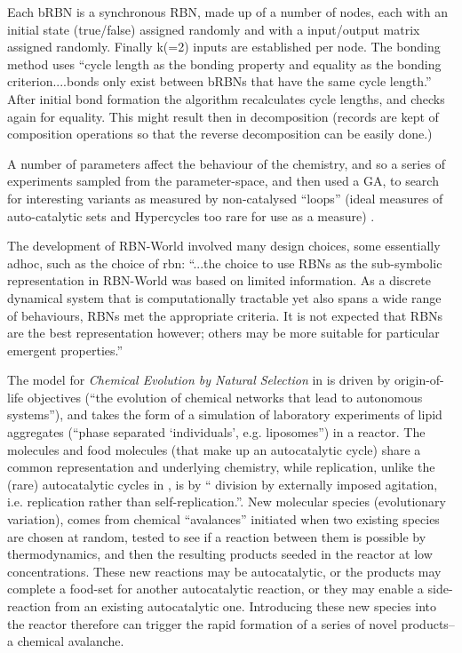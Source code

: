 Each bRBN is a synchronous RBN, made up of a number of nodes, each with an initial state (true/false) assigned randomly and with a input/output matrix assigned randomly. Finally k(=2) inputs are established per node. The bonding method uses ``cycle length as the bonding property and equality as the bonding criterion....bonds only exist between bRBNs that have the same cycle length.'' After initial bond formation the algorithm recalculates cycle lengths, and checks again for equality. This might result then in decomposition (records are kept of composition operations so that the reverse decomposition can be easily done.)

A number of parameters affect the behaviour of the chemistry, and so a series of experiments sampled from the parameter-space, and then used a GA, to search for interesting variants as measured by non-catalysed ``loops'' (ideal measures of auto-catalytic sets and Hypercycles too rare for use as a measure) \parencite[chap.8]{Faulconbridge2011}. 

The development of RBN-World involved many design choices, some essentially adhoc, such as the choice of \gls{rbn}: ``...the choice to use RBNs as the sub-symbolic representation in RBN-World was based on limited information. As a discrete dynamical system that is computationally tractable yet also spans a wide range of behaviours, RBNs met the appropriate criteria. It is not expected that RBNs are the best representation however; others may be more suitable for particular emergent properties.''

The model for \emph{Chemical Evolution by Natural Selection} in \cite{Fernando:2008xy,Fernando:2007pf} is driven by origin-of-life objectives (``the evolution of chemical networks that lead to autonomous systems''), and takes the form of a simulation of laboratory experiments of lipid aggregates (``phase separated ‘individuals’, e.g. liposomes'') in a reactor. The molecules and food molecules (that make up an autocatalytic cycle) share a common representation and underlying chemistry, while replication, unlike the (rare) autocatalytic cycles in \cite{Faulconbridge2011}, is by `` division by externally imposed agitation, i.e. replication rather than self-replication.''. New molecular species (evolutionary variation), comes from chemical ``avalances'' initiated when two existing species are chosen at random, tested to see if a reaction between them is possible by thermodynamics, and then the resulting products seeded in the reactor at low concentrations. These new reactions may be autocatalytic, or the products may complete a food-set for another autocatalytic reaction, or they may enable a side-reaction from an existing autocatalytic one. Introducing these new species into the reactor therefore can trigger the rapid formation of a series of novel products--a chemical avalanche.

